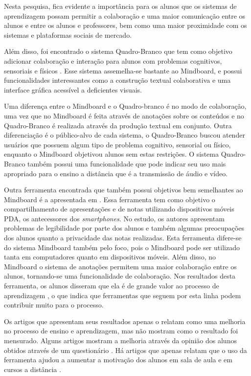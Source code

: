 Nesta pesquisa, fica evidente a importância para os alunos que os sistemas de aprendizagem possam permitir a colaboração e uma maior comunicação entre os alunos e entre os alunos e professores, bem como uma maior proximidade com os sistemas e plataformas sociais de mercado.

Além disso, foi encontrado o sistema Quadro-Branco que tem como objetivo adicionar colaboração e interação para alunos com problemas cognitivos, sensoriais e físicos \cite{quadro_branco}. Esse sistema assemelha-se bastante ao Mindboard, e possui funcionalidades interessantes como a construção textual colaborativa e uma interface gráfica acessível a deficientes visuais. 

Uma diferença entre o Mindboard e o Quadro-branco é no modo de colaboração, uma vez que no Mindboard é feita através de anotações sobre os conteúdos e no Quadro-Branco é realizada através da produção textual em conjunto. Outra diferenciação é o público-alvo de cada sistema, o Quadro-Branco buscou atender usuários que possuem algum tipo de problema cognitivo, sensorial ou físico, enquanto o Mindboard objetivou alunos sem estas restrições. O sistema Quadro-Branco também possui uma funcionalidade que pode indicar seu uso mais apropriado para o ensino a distância que é a transmissão de áudio e vídeo.

Outra ferramenta encontrada que também possui objetivos bem semelhantes ao Mindboard é a apresentada em . Essa ferramenta tem como objetivo o compartilhamento de apresentações e de notas utilizando dispositivos móveis PDA, os antecessores dos \emph{smartphones}. No estudo, os autores apresentam problemas de legibilidade por parte dos alunos e também algumas preocupações dos alunos quanto a privacidade das notas realizadas. Esta ferramenta difere-se do sistema Mindboard também pelo foco, pois o Mindboard pode ser utilizado tanta em computadores quanto em dispositivos móveis. Além disso, no Mindboard o sistema de anotações permitem uma maior colaboração entre os alunos, tornando-se uma funcionalidade de colaboração. Nos resultados desta ferramenta, os alunos disseram que ela é de grande valor ao processo de aprendizagem \cite{singh_collaborative_2004}, o que indica que ferramentas que seguem por esta linha podem contribuir muito para o processo.

Os artigos que apresentam seus resultados apenas o relatam como uma melhoria no processo de ensino e aprendizagem, mas não mostram como o resultado foi mensurado. Alguns artigos mostram a melhoria através da opinião dos alunos obtidos através de um questionário \cite{rawat_work_2008}. Há artigos que apenas relatam que o uso da ferramenta ajudou a aumentar a motivação dos alunos em sala de aula e em cursos a distância \cite{tokiwa_web-based_2009}.

